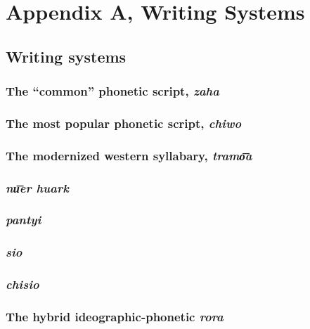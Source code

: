 \chapter{Appendix A, Writing Systems}
\label{ch:appendixa}

\section{Writing systems}

\subsection{The ``common'' phonetic script, \emph{zaha}}

\subsection{The most popular phonetic script, \emph{chiwo}}

\subsection{The modernized western syllabary, \emph{tramo͞a}}

\subsection{\emph{nu͞er huark}}

\subsection{\emph{pantyi}}

\subsection{\emph{sio}}

\subsection{\emph{chisio}}

\subsection{The hybrid ideographic-phonetic \emph{rora}}




